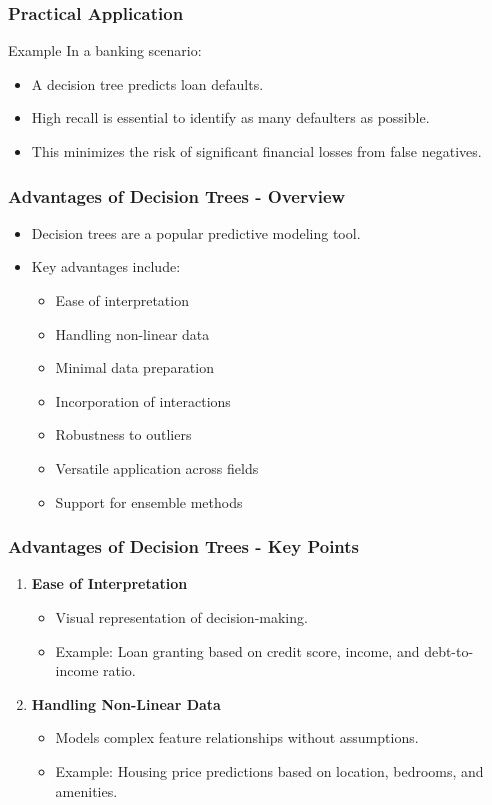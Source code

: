 \documentclass[aspectratio=169]{beamer}
\begin{document}
\begin{frame}[fragile]
    \frametitle{Practical Application}
    \begin{block}{Example}
        In a banking scenario:
        \begin{itemize}
            \item A decision tree predicts loan defaults.
            \item High recall is essential to identify as many defaulters as possible.
            \item This minimizes the risk of significant financial losses from false negatives.
        \end{itemize}
    \end{block}
\end{frame}

\begin{frame}[fragile]
    \frametitle{Advantages of Decision Trees - Overview}
    \begin{itemize}
        \item Decision trees are a popular predictive modeling tool.
        \item Key advantages include:
        \begin{itemize}
            \item Ease of interpretation
            \item Handling non-linear data
            \item Minimal data preparation
            \item Incorporation of interactions
            \item Robustness to outliers
            \item Versatile application across fields
            \item Support for ensemble methods
        \end{itemize}
    \end{itemize}
\end{frame}

\begin{frame}[fragile]
    \frametitle{Advantages of Decision Trees - Key Points}
    \begin{enumerate}
        \item \textbf{Ease of Interpretation}
        \begin{itemize}
            \item Visual representation of decision-making.
            \item Example: Loan granting based on credit score, income, and debt-to-income ratio.
        \end{itemize}

        \item \textbf{Handling Non-Linear Data}
        \begin{itemize}
            \item Models complex feature relationships without assumptions.
            \item Example: Housing price predictions based on location, bedrooms, and amenities.
        \end{itemize}
    \end{enumerate}
\end{frame}
\end{document}
